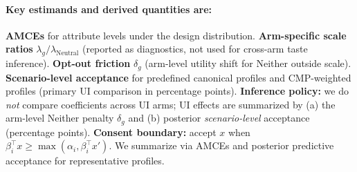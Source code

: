 \documentclass{eusset}
\begin{document}
\paragraph{Key estimands and derived quantities are:}
\textbf{AMCEs} for attribute levels under the design distribution. 
\textbf{Arm-specific scale ratios} $\lambda_g/\lambda_{\text{Neutral}}$ (reported as diagnostics, not used for cross-arm taste inference). 
\textbf{Opt-out friction} $\delta_g$ (arm-level utility shift for Neither outside scale). 
\textbf{Scenario-level acceptance} for predefined canonical profiles and CMP-weighted profiles (primary UI comparison in percentage points). 
\textbf{Inference policy:} we do \emph{not} compare coefficients across UI arms; UI effects are summarized by (a) the arm-level Neither penalty $\delta_g$ and (b) posterior \emph{scenario-level} acceptance (percentage points).
\textbf{Consent boundary:} accept $x$ when $\beta_i^\top x \ge \max(\alpha_i,\beta_i^\top x')$. We summarize via AMCEs and posterior predictive acceptance for representative profiles.
\end{document}
